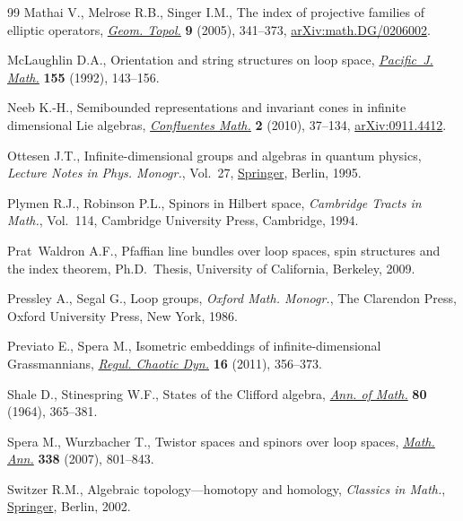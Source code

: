 \documentclass[pdftex]{sigma}
\numberwithin{equation}{section}
\begin{document}
\begin{thebibliography}{99}
Mathai V., Melrose R.B., Singer I.M., The index of projective families of
 elliptic operators,  \href{https://doi.org/10.2140/gt.2005.9.341}{\textit{Geom. Topol.}} \textbf{9} (2005), 341--373,
 \href{https://arxiv.org/abs/math.DG/0206002}{arXiv:math.DG/0206002}.

McLaughlin D.A., Orientation and string structures on loop space,
 \href{https://doi.org/10.2140/pjm.1992.155.143}{\textit{Pacific~J. Math.}} \textbf{155} (1992), 143--156.

Neeb K.-H., Semibounded representations and invariant cones in infinite
 dimensional {L}ie algebras, \href{https://doi.org/10.1142/S1793744210000132}{\textit{Confluentes Math.}} \textbf{2} (2010),
 37--134, \href{https://arxiv.org/abs/0911.4412}{arXiv:0911.4412}.

Ottesen J.T., Infinite-dimensional groups and algebras in quantum physics,
 \textit{Lecture Notes in Phys. Monogr.}, Vol.~27,  \href{https://doi.org/10.1007/978-3-540-49141-5}{Springer}, Berlin, 1995.

Plymen R.J., Robinson P.L., Spinors in {H}ilbert space, \textit{Cambridge
 Tracts in Math.}, Vol.~114, Cambridge University Press, Cambridge, 1994.

Prat~Waldron A.F., Pfaffian line bundles over loop spaces, spin structures and
 the index theorem, Ph.D.~Thesis, {U}niversity of {C}alifornia, {B}erkeley,
 2009.

Pressley A., Segal G., Loop groups, \textit{Oxford Math. Monogr.}, The Clarendon Press,
 Oxford University Press, New York, 1986.

Previato E., Spera M., Isometric embeddings of infinite-dimensional
 {G}rassmannians, \href{https://doi.org/10.1134/S1560354711030099}{\textit{Regul. Chaotic Dyn.}} \textbf{16} (2011), 356--373.

Shale D., Stinespring W.F., States of the {C}lifford algebra, \href{https://doi.org/10.2307/1970397}{\textit{Ann. of
 Math.}} \textbf{80} (1964), 365--381.

Spera M., Wurzbacher T., Twistor spaces and spinors over loop spaces,
  \href{https://doi.org/10.1007/s00208-007-0085-3}{\textit{Math. Ann.}} \textbf{338} (2007), 801--843.

Switzer R.M., Algebraic topology---homotopy and homology, \textit{Classics in Math.},
  \href{https://doi.org/10.1007/978-3-642-61923-6}{Springer}, Berlin, 2002.


\end{thebibliography}
\end{document}

